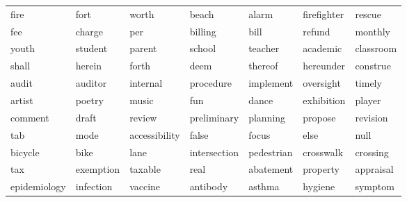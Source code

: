 \begin{table}[ht]
\begin{tabular}{lllllll}
  \cellcolor{red!10}fire & \cellcolor{red!10}fort & \cellcolor{red!10}worth & \cellcolor{red!10}beach & \cellcolor{red!10}alarm & \cellcolor{red!10}firefighter & \cellcolor{red!10}rescue \\ 
  \cellcolor{red!10}fee & \cellcolor{red!10}charge & \cellcolor{red!10}per & \cellcolor{red!10}billing & \cellcolor{red!10}bill & \cellcolor{red!10}refund & \cellcolor{red!10}monthly \\ 
  \cellcolor{red!10}youth & \cellcolor{red!10}student & \cellcolor{red!10}parent & \cellcolor{red!10}school & \cellcolor{red!10}teacher & \cellcolor{red!10}academic & \cellcolor{red!10}classroom \\ 
  \cellcolor{red!10}shall & \cellcolor{red!10}herein & \cellcolor{red!10}forth & \cellcolor{red!10}deem & \cellcolor{red!10}thereof & \cellcolor{red!10}hereunder & \cellcolor{red!10}construe \\ 
  \cellcolor{blue!10}audit & \cellcolor{blue!10}auditor & \cellcolor{blue!10}internal & \cellcolor{blue!10}procedure & \cellcolor{blue!10}implement & \cellcolor{blue!10}oversight & \cellcolor{blue!10}timely \\ 
  \cellcolor{red!40}artist & \cellcolor{red!40}poetry & \cellcolor{red!40}music & \cellcolor{red!40}fun & \cellcolor{red!40}dance & \cellcolor{red!40}exhibition & \cellcolor{red!40}player \\ 
  \cellcolor{blue!10}comment & \cellcolor{blue!10}draft & \cellcolor{blue!10}review & \cellcolor{blue!10}preliminary & \cellcolor{blue!10}planning & \cellcolor{blue!10}propose & \cellcolor{blue!10}revision \\ 
  \cellcolor{blue!10}tab & \cellcolor{blue!10}mode & \cellcolor{blue!10}accessibility & \cellcolor{blue!10}false & \cellcolor{blue!10}focus & \cellcolor{blue!10}else & \cellcolor{blue!10}null \\ 
  \cellcolor{blue!10}bicycle & \cellcolor{blue!10}bike & \cellcolor{blue!10}lane & \cellcolor{blue!10}intersection & \cellcolor{blue!10}pedestrian & \cellcolor{blue!10}crosswalk & \cellcolor{blue!10}crossing \\ 
  \cellcolor{white}tax & \cellcolor{white}exemption & \cellcolor{white}taxable & \cellcolor{white}real & \cellcolor{white}abatement & \cellcolor{white}property & \cellcolor{white}appraisal \\ 
  \cellcolor{red!20}epidemiology & \cellcolor{red!20}infection & \cellcolor{red!20}vaccine & \cellcolor{red!20}antibody & \cellcolor{red!20}asthma & \cellcolor{red!20}hygiene & \cellcolor{red!20}symptom \\ 

\end{tabular}
\end{table}
